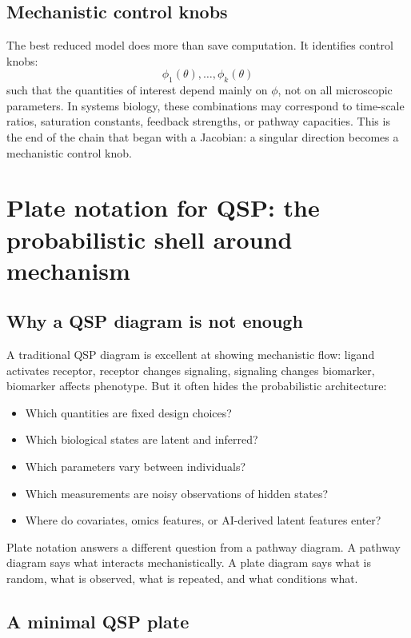\documentclass[a4paper]{article}
\newcommand{\param}{\theta}
\begin{document}
\subsection{Mechanistic control knobs}

The best reduced model does more than save computation.  It identifies control knobs:
\[
  \phi_1(\param),\ldots,\phi_k(\param)
\]
such that the quantities of interest depend mainly on \(\phi\), not on all microscopic parameters.  In systems biology, these combinations may correspond to time-scale ratios, saturation constants, feedback strengths, or pathway capacities.  This is the end of the chain that began with a Jacobian: a singular direction becomes a mechanistic control knob.

\section{Plate notation for QSP: the probabilistic shell around mechanism}

\subsection{Why a QSP diagram is not enough}

A traditional QSP diagram is excellent at showing mechanistic flow: ligand activates receptor, receptor changes signaling, signaling changes biomarker, biomarker affects phenotype.  But it often hides the probabilistic architecture:
\begin{itemize}[leftmargin=2em]
  \item Which quantities are fixed design choices?
  \item Which biological states are latent and inferred?
  \item Which parameters vary between individuals?
  \item Which measurements are noisy observations of hidden states?
  \item Where do covariates, omics features, or AI-derived latent features enter?
\end{itemize}
Plate notation answers a different question from a pathway diagram.  A pathway diagram says what interacts mechanistically.  A plate diagram says what is random, what is observed, what is repeated, and what conditions what.

\subsection{A minimal QSP plate}
\end{document}

